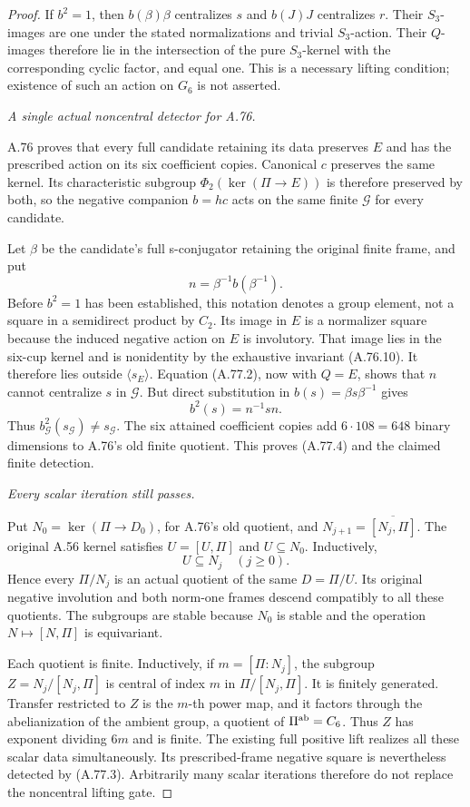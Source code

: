\begin{proof}
If \(b^2=1\), then \(b(\beta)\beta\) centralizes \(s\) and
\(b(J)J\) centralizes \(r\). Their \(S_3\)-images are one under
the stated normalizations and trivial \(S_3\)-action. Their
\(Q\)-images therefore lie in the intersection of the pure
\(S_3\)-kernel with the corresponding cyclic factor, and equal
one. This is a necessary lifting condition; existence of such an
action on \(G_6\) is not asserted.

\emph{A single actual noncentral detector for A.76.}\par
A.76 proves that every full candidate retaining its data preserves
\(E\) and has the prescribed action on its six coefficient copies.
Canonical \(c\) preserves the same kernel. Its characteristic
subgroup \(\Phi_2(\ker(\Pi\to E))\) is therefore preserved by
both, so the negative companion \(b=hc\) acts on the same finite
\(\mathcal G\) for every candidate.

Let \(\beta\) be the candidate's full s-conjugator retaining the
original finite frame, and put
\[
                         n=\beta^{-1}b(\beta^{-1}).
 \tag{A.77.7}
\]
Before \(b^2=1\) has been established, this notation denotes a
group element, not a square in a semidirect product by \(C_2\).
Its image in \(E\) is a normalizer square because the induced
negative action on \(E\) is involutory. That image lies in the
six-cup kernel and is nonidentity by the exhaustive invariant
(A.76.10). It therefore lies outside \(\langle s_E\rangle\).
Equation (A.77.2), now with \(Q=E\), shows that \(n\) cannot
centralize \(s\) in \(\mathcal G\). But direct substitution in
\(b(s)=\beta s\beta^{-1}\) gives
\[
                           b^2(s)=n^{-1}sn.
 \tag{A.77.8}
\]
Thus \(b_{\mathcal G}^2(s_{\mathcal G})\ne s_{\mathcal G}\).
The six attained coefficient copies add \(6\cdot108=648\)
binary dimensions to A.76's old finite quotient. This proves
(A.77.4) and the claimed finite detection.

\emph{Every scalar iteration still passes.}\par
Put \(N_0=\ker(\Pi\to D_0)\), for A.76's old quotient, and
\(N_{j+1}=\overline{[N_j,\Pi]}\). The original A.56 kernel
satisfies \(U=[U,\Pi]\) and \(U\subseteq N_0\). Inductively,
\[
                            U\subseteq N_j\quad(j\ge0).
 \tag{A.77.9}
\]
Hence every \(\Pi/N_j\) is an actual quotient of the same
\(D=\Pi/U\). Its original negative involution and both
norm-one frames descend compatibly to all these quotients.
The subgroups are stable because \(N_0\) is stable and the
operation \(N\mapsto[N,\Pi]\) is equivariant.

Each quotient is finite. Inductively, if \(m=[\Pi:N_j]\), the
subgroup \(Z=N_j/[N_j,\Pi]\) is central of index \(m\) in
\(\Pi/[N_j,\Pi]\). It is finitely generated. Transfer restricted
to \(Z\) is the \(m\)-th power map, and it factors through the
abelianization of the ambient group, a quotient of
\(\Pi^{\rm ab}=C_6\). Thus \(Z\) has exponent dividing \(6m\)
and is finite. The existing full positive lift realizes all these
scalar data simultaneously. Its prescribed-frame negative square
is nevertheless detected by (A.77.3). Arbitrarily many scalar
iterations therefore do not replace the noncentral lifting gate.
\end{proof}

